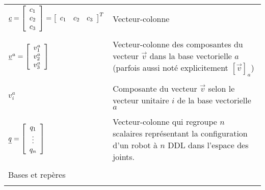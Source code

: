 \begin{center}
\begin{tabular}{p{5cm}  p{9cm}}
$\underline{c} = \left[ \begin{array}{c}
	c_1 \\ c_2 \\ c_3
\end{array}  \right] = \left[\begin{array}{ccc} c_1 & c_2 & c_3 \end{array}\right]^T $    
 & Vecteur-colonne \\   &  \\
$\underline{v}^{a}  = \left[ \begin{array}{c}
	v_1^a \\ v_2^a \\ v_3^a
\end{array}  \right]$   & Vecteur-colonne des composantes du vecteur $\vec{v}$ dans la base vectorielle $a$ (parfois aussi noté explicitement ${\left[\vec{v}\right]}_a$) \\   &  \\
$v^{a}_i$        & Composante du vecteur $\vec{v}$ selon le vecteur unitaire $i$ de la base vectorielle $a$ \\   &  \\
$\underline{q} = \left[ \begin{array}{c}
	q_1 \\  \vdots \\ q_n
\end{array}  \right] $            & Vecteur-colonne qui regroupe $n$ scalaires représentant la configuration d'un robot à $n$ DDL dans l'espace des joints. \\   &  \\
\multicolumn{2}{l}{Bases et repères} \\ \hline \\

\end{tabular}
\end{center}
